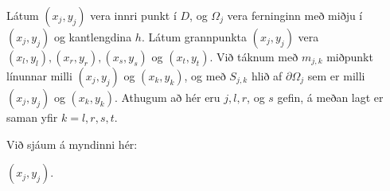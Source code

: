 \documentclass[a4paper,10pt,icelandic]{sphinxmanual}
\begin{document}

Látum \((x_j, y_j)\) vera innri punkt í \(D\), og \(\Omega_j\) vera ferninginn með miðju í \((x_j, y_j)\) og kantlengdina \(h\).
Látum grannpunkta \((x_j, y_j)\) vera \((x_l,y_l), (x_r,y_r), (x_s,y_s)\) og \((x_t,y_t)\).
Við táknum með \(m_{j,k}\) miðpunkt línunnar milli \((x_j,y_j)\) og \((x_k,y_k)\), og með \(S_{j,k}\) hlið af \(\partial\Omega_j\) sem er milli \((x_j,y_j)\) og \((x_k,y_k)\).
Athugum að hér eru \(j, l, r\), og \(s\) gefin, á meðan lagt er saman yfir \(k=l,r,s, t\).

Við sjáum á myndinni hér:


  \((x_j,y_j)\).
\end{document}
